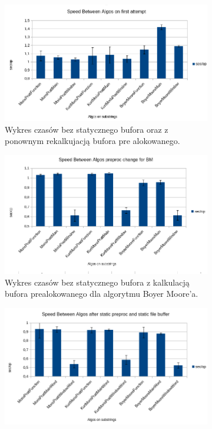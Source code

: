 \begin{figure}
\centering
\begin{subfigure}{0.8\textwidth}
    \includegraphics[width=\textwidth]{./images/GraphFirstAttempt.png}
    \caption{Wykres czasów bez statycznego bufora oraz z ponownym rekalkujacją
    bufora pre alokowanego.}
    \label{fig:GraphFirstAttempt}
\end{subfigure}
\begin{subfigure}{0.8\textwidth}
    \includegraphics[width=\textwidth]{./images/GraphPreAllocBM.png}
    \caption{Wykres czasów bez statycznego bufora z kalkulacją bufora 
    prealokowanego dla algorytmu Boyer Moore'a. }
    \label{fig:GraphPreAllocBM}
\end{subfigure}
\begin{subfigure}{0.8\textwidth}
    \includegraphics[width=\textwidth]{./images/GraphStaticPreallocAndFileBuffer.png}

\end{subfigure}
\end{figure}
